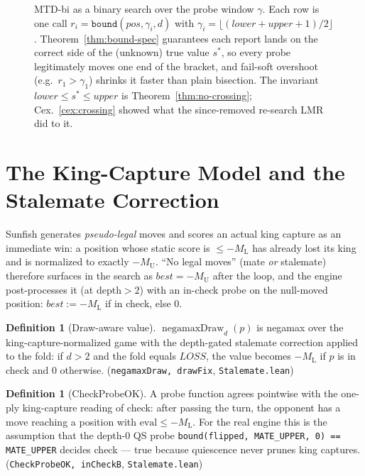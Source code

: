 \documentclass[11pt]{article}
\DeclareMathOperator{\negamaxD}{negamaxDraw}
\newcommand{\MU}{M_{\mathrm{U}}}    %
\newcommand{\ML}{M_{\mathrm{L}}}    %
\newcommand{\LOSS}{\mathit{LOSS}}   %
\newcommand{\leanref}[2]{(\texttt{#1}, \texttt{#2})}%
\theoremstyle{plain}
\theoremstyle{definition}
\newtheorem{definition}[theorem]{Definition}
\theoremstyle{remark}
\begin{document}
\begin{figure}[t]
\caption{MTD-bi as a binary search over the probe window $\gamma$.
Each row is one call
$r_i = \texttt{bound}(\mathit{pos}, \gamma_i, d)$ with
$\gamma_i = \lfloor(\mathit{lower}+\mathit{upper}+1)/2\rfloor$.
Theorem~\ref{thm:bound-spec} guarantees each report lands on the correct
side of the (unknown) true value $s^*$, so every probe legitimately
moves one end of the bracket, and fail-soft overshoot (e.g.\ $r_1 >
\gamma_1$) shrinks it faster than plain bisection.  The invariant
$\mathit{lower} \le s^* \le \mathit{upper}$ is
Theorem~\ref{thm:no-crossing}; Cex.~\ref{cex:crossing} showed what the
since-removed re-search LMR did to it.}
\label{fig:mtdbi}
\end{figure}

\section{The King-Capture Model and the Stalemate Correction}
\label{sec:stalemate}

Sunfish generates \emph{pseudo-legal} moves and scores an actual king
capture as an immediate win: a position whose static score is
$\le -\ML$ has already lost its king and is normalized to exactly
$-\MU$.  ``No legal moves'' (mate \emph{or} stalemate) therefore
surfaces in the search as $\mathit{best} = -\MU$ after the loop, and the
engine post-processes it (at $\mathrm{depth} > 2$) with an in-check
probe on the null-moved position:
$\mathit{best} := -\ML$ if in check, else $0$.

\begin{definition}[Draw-aware value]
$\negamaxD_d(p)$ is negamax over the king-capture-normalized game with
the depth-gated stalemate correction applied to the fold: if
$d > 2$ and the fold equals $\LOSS$, the value becomes $-\ML$ if $p$ is
in check and $0$ otherwise. \leanref{negamaxDraw, drawFix}{Stalemate.lean}
\end{definition}

\begin{definition}[CheckProbeOK]
A probe function agrees pointwise with the one-ply king-capture reading
of check: after passing the turn, the opponent has a move reaching a
position with $\mathrm{eval} \le -\ML$.  For the real engine this is the
assumption that the depth-0 QS probe
\texttt{bound(flipped, MATE\_UPPER, 0) == MATE\_UPPER} decides check ---
true because quiescence never prunes king captures.
\leanref{CheckProbeOK, inCheckB}{Stalemate.lean}
\end{definition}
\end{document}
